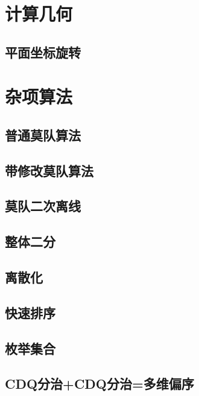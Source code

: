 \documentclass[twocolumn,a4]{article}  %
\begin{document}
	\section{计算几何}
		\subsection{平面坐标旋转}
	 	 	
	
	\section{杂项算法}
		\subsection{普通莫队算法}
	 	 	
	 	 	
	 	\subsection{带修改莫队算法}
	 	 	
	 	 	
	 	\subsection{莫队二次离线}
	 	 	
	 	 	
	 	\subsection{整体二分}
	 	 	
	 	 	
	 	\subsection{离散化}
	 	 	
	 	 	
	 	\subsection{快速排序}
	 	 	
	 	 	
 	 	\subsection{枚举集合}
	 	 	
	 	 	
	 	\subsection{CDQ分治+CDQ分治=多维偏序}
	 	 	
\end{document}
